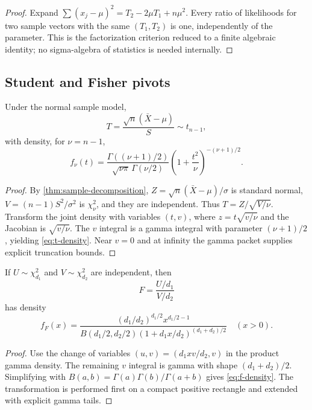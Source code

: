\begin{proof}
Expand
$\sum(x_j-\mu)^2=T_2-2\mu T_1+n\mu^2$.  Every ratio of likelihoods for two sample vectors with the same $(T_1,T_2)$ is one, independently of the parameter.  This is the factorization criterion reduced to a finite algebraic identity; no sigma-algebra of statistics is needed internally.
\end{proof}

\subsection{Student and Fisher pivots}

\begin{theorem}\label{thm:student}
Under the normal sample model,
\begin{equation}\label{eq:t-stat}
 T=\frac{\sqrt n(\bar X-\mu)}{S}\sim t_{n-1},
\end{equation}
with density, for $\nu=n-1$,
\begin{equation}\label{eq:t-density}
 f_\nu(t)=
 \frac{\Gamma((\nu+1)/2)}{\sqrt{\nu\pi}\,\Gamma(\nu/2)}
 \left(1+\frac{t^2}{\nu}
\right)^{-(\nu+1)/2}.
\end{equation}
\end{theorem}

\begin{proof}
By \cref{thm:sample-decomposition}, $Z=\sqrt n(\bar X-\mu)/\sigma$ is standard normal, $V=(n-1)S^2/\sigma^2$ is $\chi^2_\nu$, and they are independent.  Thus $T=Z/\sqrt{V/\nu}$.  Transform the joint density with variables $(t,v)$, where $z=t\sqrt{v/\nu}$ and the Jacobian is $\sqrt{v/\nu}$.  The $v$ integral is a gamma integral with parameter $(\nu+1)/2$, yielding \eqref{eq:t-density}.  Near $v=0$ and at infinity the gamma packet supplies explicit truncation bounds.
\end{proof}

\begin{theorem}[F ratio]\label{thm:f-distribution}
If $U\sim\chi^2_{d_1}$ and $V\sim\chi^2_{d_2}$ are independent, then
\[
 F=\frac{U/d_1}{V/d_2}
\]
has density
\begin{equation}\label{eq:f-density}
 f_F(x)=
 \frac{(d_1/d_2)^{d_1/2}x^{d_1/2-1}}
 {B(d_1/2,d_2/2)
  (1+d_1x/d_2)^{(d_1+d_2)/2}}
 \quad(x>0).
\end{equation}
\end{theorem}

\begin{proof}
Use the change of variables $(u,v)=(d_1xv/d_2,v)$ in the product gamma density.  The remaining $v$ integral is gamma with shape $(d_1+d_2)/2$.  Simplifying with
$B(a,b)=\Gamma(a)\Gamma(b)/\Gamma(a+b)$ gives \eqref{eq:f-density}.  The transformation is performed first on a compact positive rectangle and extended with explicit gamma tails.
\end{proof}

